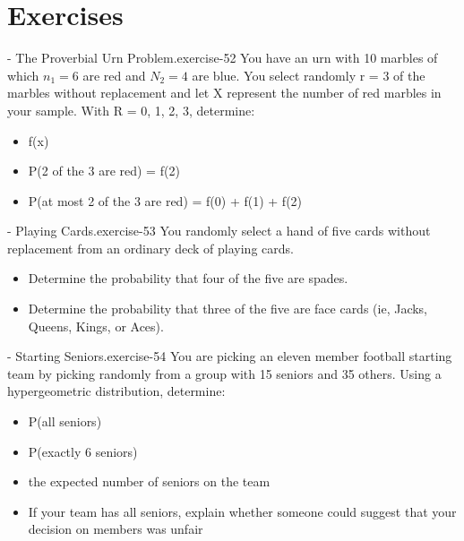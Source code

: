 \documentclass[10pt,]{book}
\numberwithin{equation}{section}
\begin{document}
\section[{Exercises}]{Exercises}\label{section-44}
\hypertarget{p-824}{}%
\begin{inlineexercise}{- The Proverbial Urn Problem.}{exercise-52}%
\hypertarget{p-825}{}%
You have an urn with 10 marbles of which \(n_1 = 6\) are red and \(N_2 = 4\) are blue. You select randomly r = 3 of the marbles without replacement and let X represent the number of red marbles in your sample. With R = {0, 1, 2, 3}, determine: \leavevmode%
\begin{itemize}[label=\textbullet]
\item{}f(x)%
\item{}P(2 of the 3 are red) = f(2)%
\item{}P(at most 2 of the 3 are red) = f(0) + f(1) + f(2)%
\end{itemize}
%
\end{inlineexercise}
%
\par
\hypertarget{p-826}{}%
\begin{inlineexercise}{- Playing Cards.}{exercise-53}%
\hypertarget{p-827}{}%
You randomly select a hand of five cards without replacement from an ordinary deck of playing cards. \leavevmode%
\begin{itemize}[label=\textbullet]
\item{}Determine the probability that four of the five are spades.%
\item{}Determine the probability that three of the five are face cards (ie, Jacks, Queens, Kings, or Aces).%
\end{itemize}
%
\end{inlineexercise}
%
\par
\hypertarget{p-828}{}%
\begin{inlineexercise}{- Starting Seniors.}{exercise-54}%
\hypertarget{p-829}{}%
You are picking an eleven member football starting team by picking randomly from a group with 15 seniors and 35 others.  Using a hypergeometric distribution, determine: \leavevmode%
\begin{itemize}[label=\textbullet]
\item{}P(all seniors)%
\item{}P(exactly 6 seniors)%
\item{}the expected number of seniors on the team%
\item{}If your team has all seniors, explain whether someone could suggest that your decision on members was unfair%
\end{itemize}
%
\end{inlineexercise}
\end{document}
